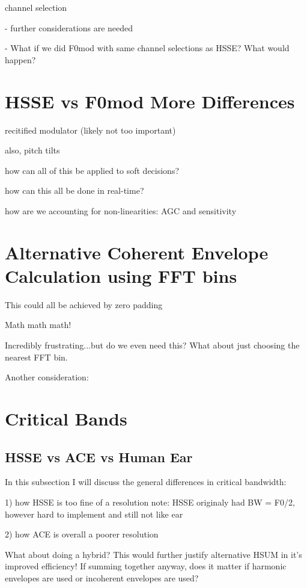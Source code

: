\documentclass [11pt, proquest] {uwthesis}[2015/03/03]
\begin{document}
channel selection

 - further considerations are needed

 - What if we did F0mod with same channel selections as HSSE?  What would happen?

\section{HSSE vs F0mod More Differences}

recitified modulator (likely not too important)

also, pitch tilts

how can all of this be applied to soft decisions?

how can this all be done in real-time?

how are we accounting for non-linearities: AGC and sensitivity




\section{Alternative Coherent Envelope Calculation using FFT bins}

This could all be achieved by zero padding

Math math math!

Incredibly frustrating...but do we even need this?  What about just choosing the nearest FFT bin.

Another consideration: 

\section{Critical Bands}

\subsection{HSSE vs ACE vs Human Ear}

In this subsection I will discuss the general differences in critical bandwidth:

1) how HSSE is too fine of a resolution
note: HSSE originaly had BW = F0/2, however hard to implement and still not like ear

2) how ACE is overall a poorer resolution

What about doing a hybrid?  This would further justify alternative HSUM in it's improved efficiency!  If summing together anyway, does it matter if harmonic envelopes are used or incoherent envelopes are used?
\end{document}
